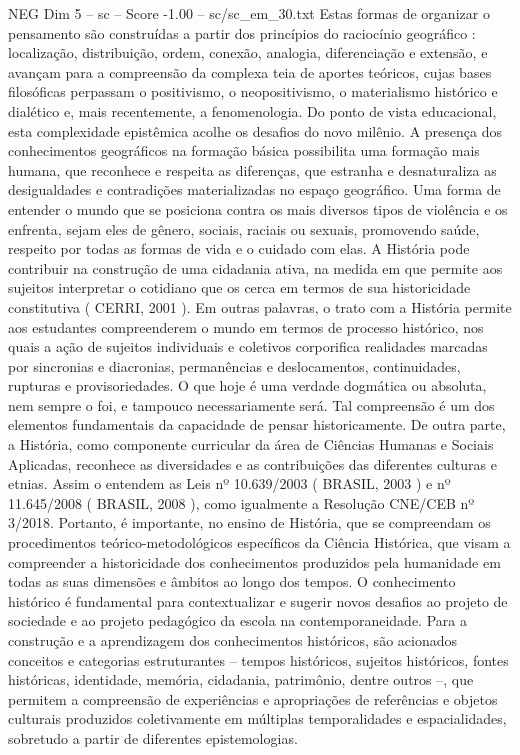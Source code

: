 \begin{textsample}{NEG Dim 5 – sc – Score -1.00 – sc/sc\_em\_30.txt}
Estas formas de organizar o pensamento são construídas a partir dos princípios do raciocínio geográfico : localização, distribuição, ordem, conexão, analogia, diferenciação e extensão, e avançam para a compreensão da complexa teia de aportes teóricos, cujas bases filosóficas perpassam o positivismo, o neopositivismo, o materialismo histórico e dialético e, mais recentemente, a fenomenologia.
Do ponto de vista educacional, esta complexidade epistêmica acolhe os desafios do novo milênio.
A presença dos conhecimentos geográficos na formação básica possibilita uma formação mais humana, que reconhece e respeita as diferenças, que estranha e desnaturaliza as desigualdades e contradições materializadas no espaço geográfico.
Uma forma de entender o mundo que se posiciona contra os mais diversos tipos de violência e os enfrenta, sejam eles de gênero, sociais, raciais ou sexuais, promovendo saúde, respeito por todas as formas de vida e o cuidado com elas.
A História pode contribuir na construção de uma cidadania ativa, na medida em que permite aos sujeitos interpretar o cotidiano que os cerca em termos de sua historicidade constitutiva ( CERRI, 2001 ).
Em outras palavras, o trato com a História permite aos estudantes compreenderem o mundo em termos de processo histórico, nos quais a ação de sujeitos individuais e coletivos corporifica realidades marcadas por sincronias e diacronias, permanências e deslocamentos, continuidades, rupturas e provisoriedades.
O que hoje é uma verdade dogmática ou absoluta, nem sempre o foi, e tampouco necessariamente será.
Tal compreensão é um dos elementos fundamentais da capacidade de pensar historicamente.
De outra parte, a História, como componente curricular da área de Ciências Humanas e Sociais Aplicadas, reconhece as diversidades e as contribuições das diferentes culturas e etnias.
Assim o entendem as Leis nº 10.639/2003 ( BRASIL, 2003 ) e nº 11.645/2008 ( BRASIL, 2008 ), como igualmente a Resolução CNE/CEB nº 3/2018.
Portanto, é importante, no ensino de História, que se compreendam os procedimentos teórico-metodológicos específicos da Ciência Histórica, que visam a compreender a historicidade dos conhecimentos produzidos pela humanidade em todas as suas dimensões e âmbitos ao longo dos tempos.
O conhecimento histórico é fundamental para contextualizar e sugerir novos desafios ao projeto de sociedade e ao projeto pedagógico da escola na contemporaneidade.
Para a construção e a aprendizagem dos conhecimentos históricos, são acionados conceitos e categorias estruturantes – tempos históricos, sujeitos históricos, fontes históricas, identidade, memória, cidadania, patrimônio, dentre outros –, que permitem a compreensão de experiências e apropriações de referências e objetos culturais produzidos coletivamente em múltiplas temporalidades e espacialidades, sobretudo a partir de diferentes epistemologias.

\end{textsample}
